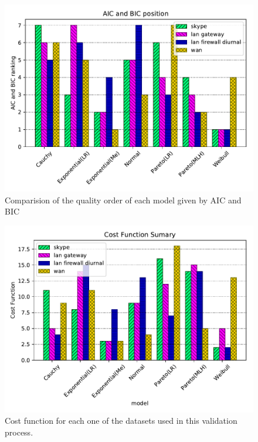 
\begin{figure}[!ht]
	\centering
	\includegraphics[scale=1]{figures/ch4/aic-bic-order}
	\caption{Comparision of the quality order of each model given by AIC and BIC}
	\label{fig:aic-bic-order}
\end{figure}


\begin{figure}[ht!]
\includegraphics[scale=1]{figures/ch4/cost-function-summary}
\caption{Cost function for each one of the datasets used in this validation process.}
\label{fig:model-order-cost}
\end{figure}

